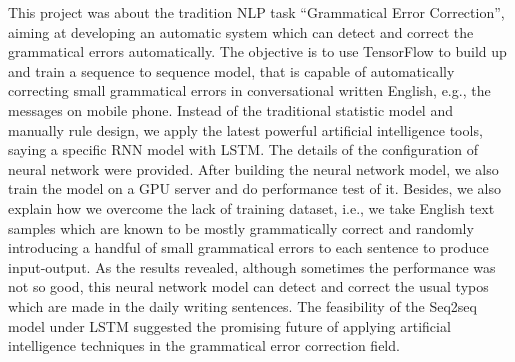 \justifying
This project was about the tradition NLP task “Grammatical Error Correction”, aiming at developing an automatic system which can detect and correct the grammatical errors automatically. The objective is to use TensorFlow to build up and train a sequence to sequence model, that is capable of automatically correcting small grammatical errors in conversational written English, e.g., the messages on mobile phone. Instead of the traditional statistic model and manually rule design, we apply the latest powerful artificial intelligence tools, saying a specific RNN model with LSTM. The details of the configuration of neural network were provided. After building the neural network model, we also train the model on a GPU server and do performance test of it. Besides, we also explain how we overcome the lack of training dataset, i.e., we take English text samples which are known to be mostly grammatically correct and randomly introducing a handful of small grammatical errors to each sentence to produce input-output. As the results revealed, although sometimes the performance was not so good, this neural network model can detect and correct the usual typos which are made in the daily writing sentences. The feasibility of the Seq2seq model under LSTM suggested the promising future of applying artificial intelligence techniques in the grammatical error correction field.